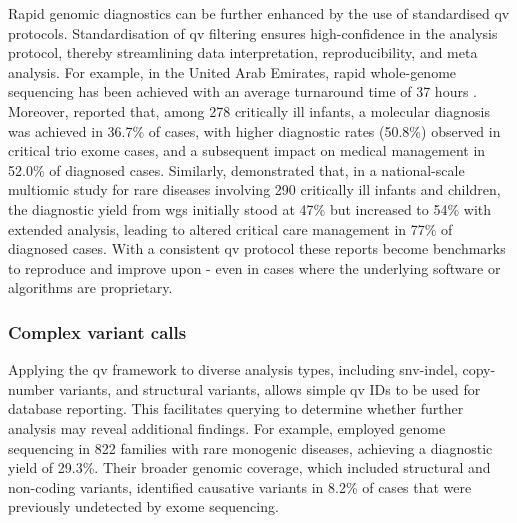 Rapid genomic diagnostics can be further enhanced by the use of standardised \ac{qv} protocols. Standardisation of \ac{qv} filtering ensures high-confidence in the analysis protocol, thereby streamlining data interpretation, reproducibility, and meta analysis. For example, in the United Arab Emirates, rapid whole-genome sequencing has been achieved with an average turnaround time of 37 hours \citep{abou2023rapid}. Moreover, \citet{meng2017use} reported that, among 278 critically ill infants, a molecular diagnosis was achieved in 36.7\% of cases, with higher diagnostic rates (50.8\%) observed in critical trio exome cases, and a subsequent impact on medical management in 52.0\% of diagnosed cases. Similarly, \citet{lunke2023integrated} demonstrated that, in a national-scale multiomic study for rare diseases involving 290 critically ill infants and children, the diagnostic yield from \ac{wgs} initially stood at 47\% but increased to 54\% with extended analysis, leading to altered critical care management in 77\% of diagnosed cases.
With a consistent \ac{qv} protocol these reports become benchmarks to reproduce and improve upon - even in cases where the underlying software or algorithms are proprietary.

\subsubsection{Complex variant calls}

Applying the \ac{qv}  framework to diverse analysis types, including \ac{snv}-\ac{indel}, copy-number variants, and structural variants, allows simple \ac{qv}  IDs to be used for database reporting. This facilitates querying to determine whether further analysis may reveal additional findings. For example, \citet{wojcik2024genome} employed genome sequencing in 822 families with rare monogenic diseases, achieving a diagnostic yield of 29.3\%. Their broader genomic coverage, which included structural and non-coding variants, identified causative variants in 8.2\% of cases that were previously undetected by exome sequencing.

